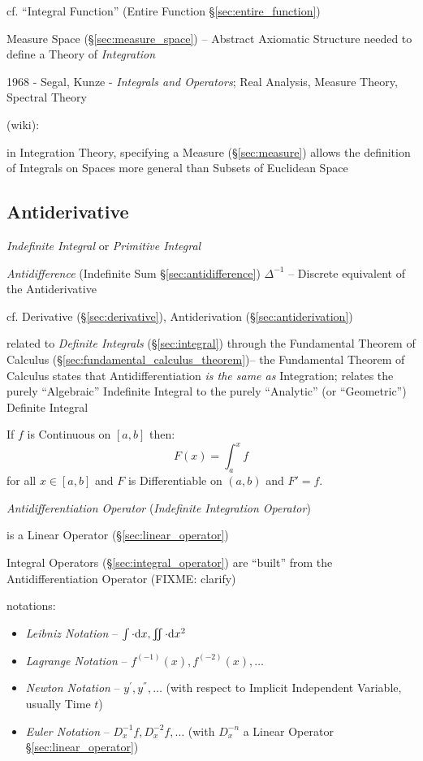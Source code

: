 cf. ``Integral Function'' (Entire Function \S\ref{sec:entire_function})

\fist Measure Space (\S\ref{sec:measure_space}) -- Abstract Axiomatic Structure
needed to define a Theory of \emph{Integration}

1968 - Segal, Kunze - \emph{Integrals and Operators}; Real Analysis, Measure
Theory, Spectral Theory

(wiki):

in Integration Theory, specifying a Measure (\S\ref{sec:measure}) allows the
definition of Integrals on Spaces more general than Subsets of Euclidean Space



\subsection{Antiderivative}\label{sec:antiderivative}

\emph{Indefinite Integral} or \emph{Primitive Integral}

\fist \emph{Antidifference} (Indefinite Sum \S\ref{sec:antidifference})
$\Delta^{-1}$ -- Discrete equivalent of the Antiderivative

\fist cf. Derivative (\S\ref{sec:derivative}), Antiderivation
(\S\ref{sec:antiderivation})

\fist related to \emph{Definite Integrals} (\S\ref{sec:integral}) through the
Fundamental Theorem of Calculus (\S\ref{sec:fundamental_calculus_theorem})-- the
Fundamental Theorem of Calculus states that Antidifferentiation \emph{is the
  same as} Integration; relates the purely ``Algebraic'' Indefinite Integral
to the purely ``Analytic'' (or ``Geometric'') Definite Integral

If $f$ is Continuous on $[a,b]$ then:
\[
  F(x) = \int_a^x f
\]
for all $x \in [a,b]$ and $F$ is Differentiable on $(a,b)$ and $F' = f$.

\emph{Antidifferentiation Operator} (\emph{Indefinite Integration Operator})

is a Linear Operator (\S\ref{sec:linear_operator})

\fist Integral Operators (\S\ref{sec:integral_operator}) are ``built'' from the
Antidifferentiation Operator (FIXME: clarify)

notations:
\begin{itemize}
  \item \emph{Leibniz Notation} --
    $\int \cdot \mathrm{d}x, \iint \cdot \mathrm{d}x^2$
  \item \emph{Lagrange Notation} -- $f^{(-1)}(x), f^{(-2)}(x), \ldots$
  \item \emph{Newton Notation} -- $y^{'}, y^{''}, \ldots$ (with respect
    to Implicit Independent Variable, usually Time $t$)
  \item \emph{Euler Notation} -- $D^{-1}_x{f}, D^{-2}_x{f}, \ldots$ (with
    $D_x^{-n}$ a Linear  Operator \S\ref{sec:linear_operator})
\end{itemize}


